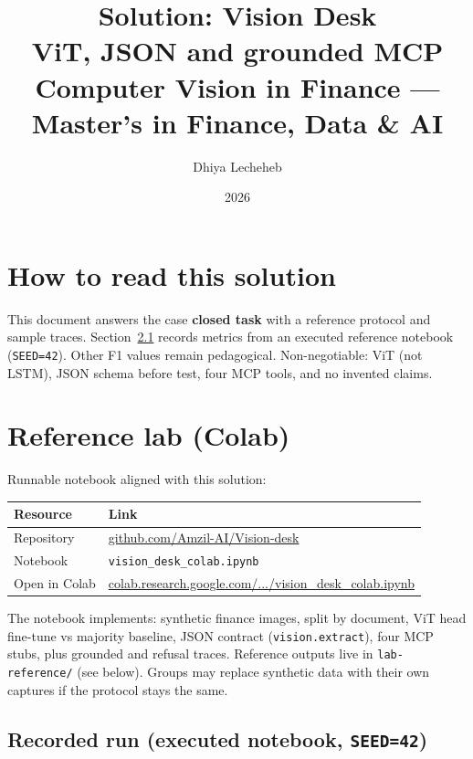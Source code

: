 \documentclass[11pt,a4paper]{article}
\title{%
  \textbf{Solution: Vision Desk}\\[0.35em]
  \large ViT, JSON and grounded MCP\\[0.5em]
  \normalsize Computer Vision in Finance --- Master's in Finance, Data \& AI
}
\author{Dhiya Lecheheb}
\date{2026}
\begin{document}
\maketitle
\thispagestyle{empty}

\section{How to read this solution}

This document answers the case \textbf{closed task} with a reference protocol
and sample traces. Section~\ref{sec:lab-run} records metrics from an executed
reference notebook (\texttt{SEED=42}). Other F1 values remain pedagogical.
Non-negotiable: ViT (not LSTM), JSON schema before test, four MCP tools,
and no invented claims.

\section{Reference lab (Colab)}

Runnable notebook aligned with this solution:

\begin{center}
\renewcommand{\arraystretch}{1.15}
\begin{tabular}{@{}p{3.2cm}p{11.4cm}@{}}
\toprule
\textbf{Resource} & \textbf{Link} \\
\midrule
Repository & \href{https://github.com/Amzil-AI/Vision-desk}{github.com/Amzil-AI/Vision-desk} \\
Notebook & \texttt{vision\_desk\_colab.ipynb} \\
Open in Colab & \href{https://colab.research.google.com/github/Amzil-AI/Vision-desk/blob/main/vision_desk_colab.ipynb}{colab.research.google.com/.../vision\_desk\_colab.ipynb} \\
\bottomrule
\end{tabular}
\end{center}

The notebook implements: synthetic finance images, split by document, ViT head
fine-tune vs majority baseline, JSON contract (\texttt{vision.extract}), four MCP
stubs, plus grounded and refusal traces. Reference outputs live in
\texttt{lab-reference/} (see below). Groups may replace synthetic data with their
own captures if the protocol stays the same.

\subsection{Recorded run (executed notebook, \texttt{SEED=42})}
\label{sec:lab-run}
\end{document}
